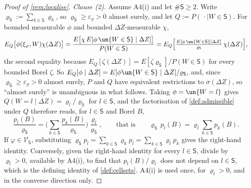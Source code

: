 \begin{proof}[Proof of \cref{rem:localise}]
\emph{Clause \textup{(2)}.} Assume A4(i) and let $\#\mathsf S\ge2$. Write
$\varrho_{\mathsf S}:=\sum_{k\in\mathsf S}\varrho_k$, so $\varrho_{\mathsf S}\ge\varepsilon_\varrho>0$
almost surely, and let $Q:=P(\,\cdot\mid W\in\mathsf S)$. For bounded measurable $\phi$ and bounded
$\Delta Z$-measurable $\chi$,
\[
E_Q\big[\phi(\xi_\varphi,W)\chi(\Delta Z)\big]
=\frac{E\big[\chi\,E[\phi\,\un\{W\in\mathsf S\}\mid\Delta Z]\big]}{P(W\in\mathsf S)}
=E_Q\Big[\tfrac{E[\phi\,\un\{W\in\mathsf S\}\mid\Delta Z]}{\varrho_{\mathsf S}}\,\chi(\Delta Z)\Big],
\]
the second equality because $E_Q[\zeta(\Delta Z)]=E[\zeta\varrho_{\mathsf S}]/P(W\in\mathsf S)$ for
every bounded Borel $\zeta$. So $E_Q[\phi\mid\Delta Z]=E[\phi\un\{W\in\mathsf S\}\mid\Delta Z]/\varrho_{\mathsf S}$,
and, since $\varrho_{\mathsf S}\ge\varepsilon_\varrho>0$ almost surely, $P$ and $Q$ have equivalent
restrictions to $\sigma(\Delta Z)$, so ``almost surely'' is unambiguous in what follows. Taking
$\phi=\un\{W=l\}$ gives $Q(W=l\mid\Delta Z)=\varrho_l/\varrho_{\mathsf S}$ for $l\in\mathsf S$, and the
factorisation of \cref{def:admissible} under $Q$ therefore reads, for $l\in\mathsf S$ and Borel $B$,
\[
\frac{p_l(B)}{\varrho_{\mathsf S}}
=\Big(\sum_{k\in\mathsf S}\frac{p_k(B)}{\varrho_{\mathsf S}}\Big)\frac{\varrho_l}{\varrho_{\mathsf S}},
\qquad\text{that is}\qquad
\varrho_{\mathsf S}\,p_l(B)=\varrho_l\sum_{k\in\mathsf S}p_k(B).
\]
If $\varphi\in\mathcal V_{\mathsf S}$, substituting $\varrho_{\mathsf S}p_l=\sum_{k\in\mathsf S}\varrho_kp_l
=\sum_{k\in\mathsf S}\varrho_lp_k$ gives the right-hand identity. Conversely, given the right-hand
identity for every $l\in\mathsf S$, divide by $\varrho_l>0$, available by A4(i), to find that
$p_l(B)/\varrho_l$ does not depend on $l\in\mathsf S$, which is the defining identity of
\cref{def:cellsets}. A4(i) is used once, for $\varrho_l>0$, and in the converse direction only.


\end{proof}
